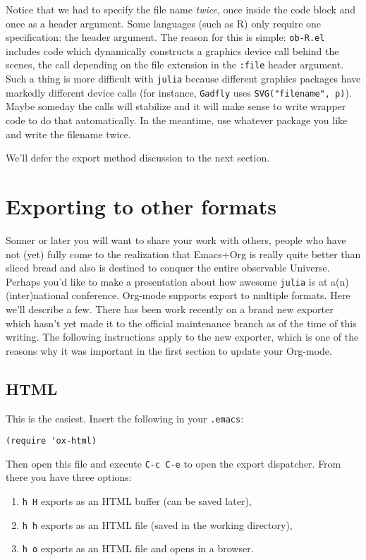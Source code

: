 \documentclass[11pt]{article}
\begin{document}
Notice that we had to specify the file name \emph{twice}, once inside the code block and once as a header argument.  Some languages (such as R) only require one specification: the header argument.  The reason for this is simple: \texttt{ob-R.el} includes code which dynamically constructs a graphics device call behind the scenes, the call depending on the file extension in the \texttt{:file} header argument.  Such a thing is more difficult with \texttt{julia} because different graphics packages have markedly different device calls (for instance, \texttt{Gadfly} uses \texttt{SVG("filename", p)}).  Maybe someday the calls will stabilize and it will make sense to write wrapper code to do that automatically.  In the meantime, use whatever package you like and write the filename twice.

We'll defer the export method discussion to the next section.
\section[Exporting to other formats]{Exporting to other formats}
\label{sec-4}

Sonner or later you will want to share your work with others, people who have not (yet) fully come to the realization that Emacs+Org is really quite better than sliced bread and also is destined to conquer the entire observable Universe.  Perhaps you'd like to make a presentation about how awesome \texttt{julia} is at a(n) (inter)national conference. Org-mode supports export to multiple formats.  Here we'll describe a few.  There has been work recently on a brand new exporter which hasn't yet made it to the official maintenance branch as of the time of this writing.  The following instructions apply to the new exporter, which is one of the reasons why it was important in the first section to update your Org-mode.

\subsection[HTML]{HTML}
\label{sec-4-1}
This is the easiest. Insert the following in your \texttt{.emacs}:

\begin{verbatim}
(require 'ox-html)
\end{verbatim}

Then open this file and execute \texttt{C-c C-e} to open the export dispatcher.  From there you have three options:

\begin{enumerate}
\item \texttt{h H} exports as an HTML buffer (can be saved later),
\item \texttt{h h} exports as an HTML file (saved in the working directory),
\item \texttt{h o} exports as an HTML file and opens in a browser.
\end{enumerate}
\end{document}
